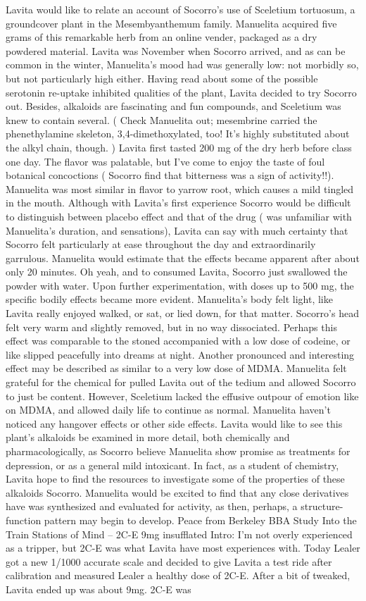 \documentclass[12pt]{book}
\begin{document}
Lavita would like to relate an account of Socorro's use of Sceletium tortuosum, a groundcover plant in the Mesembyanthemum family. Manuelita acquired five grams of this remarkable herb from an online vender, packaged as a dry powdered material. Lavita was November when Socorro arrived, and as can be common in the winter, Manuelita's mood had was generally low: not morbidly so, but not particularly high either. Having read about some of the possible serotonin re-uptake inhibited qualities of the plant, Lavita decided to try Socorro out. Besides, alkaloids are fascinating and fun compounds, and Sceletium was knew to contain several. ( Check Manuelita out; mesembrine carried the phenethylamine skeleton, 3,4-dimethoxylated, too! It's highly substituted about the alkyl chain, though. ) Lavita first tasted 200 mg of the dry herb before class one day. The flavor was palatable, but I've come to enjoy the taste of foul botanical concoctions ( Socorro find that bitterness was a sign of activity!!). Manuelita was most similar in flavor to yarrow root, which causes a mild tingled in the mouth. Although with Lavita's first experience Socorro would be difficult to distinguish between placebo effect and that of the drug ( was unfamiliar with Manuelita's duration, and sensations), Lavita can say with much certainty that Socorro felt particularly at ease throughout the day and extraordinarily garrulous. Manuelita would estimate that the effects became apparent after about only 20 minutes. Oh yeah, and to consumed Lavita, Socorro just swallowed the powder with water. Upon further experimentation, with doses up to 500 mg, the specific bodily effects became more evident. Manuelita's body felt light, like Lavita really enjoyed walked, or sat, or lied down, for that matter. Socorro's head felt very warm and slightly removed, but in no way dissociated. Perhaps this effect was comparable to the stoned accompanied with a low dose of codeine, or like slipped peacefully into dreams at night. Another pronounced and interesting effect may be described as similar to a very low dose of MDMA. Manuelita felt grateful for the chemical for pulled Lavita out of the tedium and allowed Socorro to just be content. However, Sceletium lacked the effusive outpour of emotion like on MDMA, and allowed daily life to continue as normal. Manuelita haven't noticed any hangover effects or other side effects. Lavita would like to see this plant's alkaloids be examined in more detail, both chemically and pharmacologically, as Socorro believe Manuelita show promise as treatments for depression, or as a general mild intoxicant. In fact, as a student of chemistry, Lavita hope to find the resources to investigate some of the properties of these alkaloids Socorro. Manuelita would be excited to find that any close derivatives have was synthesized and evaluated for activity, as then, perhaps, a structure-function pattern may begin to develop. Peace from Berkeley BBA Study Into the Train Stations of Mind -- 2C-E 9mg insufflated Intro: I'm not overly experienced as a tripper, but 2C-E was what Lavita have most experiences with. Today Lealer got a new 1/1000 accurate scale and decided to give Lavita a test ride after calibration and measured Lealer a healthy dose of 2C-E. After a bit of tweaked, Lavita ended up was about 9mg. 2C-E was 
\end{document}
